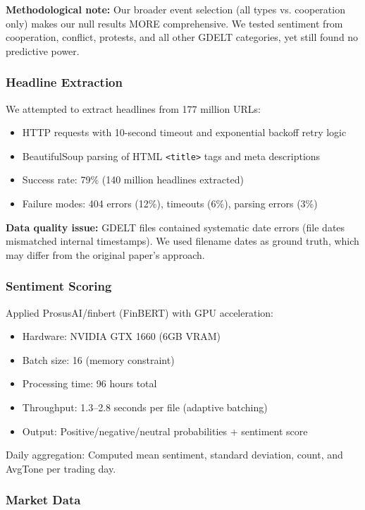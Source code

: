 \documentclass[11pt]{article}
\begin{document}
\textbf{Methodological note:} Our broader event selection (all types vs. cooperation only) makes our null results MORE comprehensive. We tested sentiment from cooperation, conflict, protests, and all other GDELT categories, yet still found no predictive power.

\subsubsection{Headline Extraction}

We attempted to extract headlines from 177 million URLs:
\begin{itemize}
    \item HTTP requests with 10-second timeout and exponential backoff retry logic
    \item BeautifulSoup parsing of HTML \texttt{<title>} tags and meta descriptions
    \item Success rate: 79\% (140 million headlines extracted)
    \item Failure modes: 404 errors (12\%), timeouts (6\%), parsing errors (3\%)
\end{itemize}

\textbf{Data quality issue:} GDELT files contained systematic date errors (file dates mismatched internal timestamps). We used filename dates as ground truth, which may differ from the original paper's approach.

\subsubsection{Sentiment Scoring}

Applied ProsusAI/finbert (FinBERT) with GPU acceleration:
\begin{itemize}
    \item Hardware: NVIDIA GTX 1660 (6GB VRAM)
    \item Batch size: 16 (memory constraint)
    \item Processing time: 96 hours total
    \item Throughput: 1.3--2.8 seconds per file (adaptive batching)
    \item Output: Positive/negative/neutral probabilities + sentiment score
\end{itemize}

Daily aggregation: Computed mean sentiment, standard deviation, count, and AvgTone per trading day.

\subsubsection{Market Data}
\end{document}
